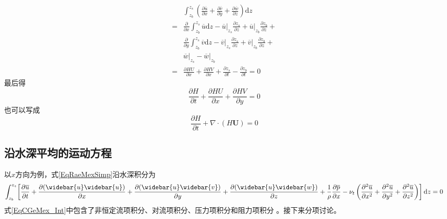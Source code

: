 \begin{equation*}
  \begin{aligned}
  &\int_{z_{b}}^{ z_{s}}\!
  \left(
  \frac{\partial \overline{u}}{\partial x} +
  \frac{\partial \overline{v}}{\partial y} +
  \frac{\partial \overline{w}}{\partial z} 
  \right)
  \mathrm{d}z
  \\
  =&
  \frac{\partial}{\partial x}
  \int_{z_{b}}^{ z_{s}}\!
  \overline{u}
  \mathrm{d}z
  -
  \left.\overline{u}\right|_{z_{s}}
    \frac{\partial z_{s}}{\partial z}
  +
  \left.\overline{u}\right|_{z_{b}}
    \frac{\partial z_{b}}{\partial z}
   + \\
  &
  \frac{\partial}{\partial y}
  \int_{z_{b}}^{ z_{s}}\!
  \overline{v}
  \mathrm{d}z
  -
  \left.\overline{v}\right|_{z_{s}}
    \frac{\partial z_{s}}{\partial z}
  +
  \left.\overline{v}\right|_{z_{b}}
    \frac{\partial z_{b}}{\partial z}
    + \\
  &
  \left.\overline{w}\right|_{z_{s}}
    -
    \left.\overline{w}\right|_{z_{b}}
      \\
  =&
  \frac{\partial HU}{\partial x} +
  \frac{\partial HV}{\partial x} +
  \frac{\partial  z_{s}}{\partial t} -
  \frac{\partial z_{b}}{\partial t}
  =
  0
  \end{aligned}
\end{equation*}
最后得
\begin{equation}
  \frac{\partial H}{\partial t} +
  \frac{\partial HU}{\partial x} +
  \frac{\partial HV}{\partial y}
  =
  0
\end{equation}
也可以写成
\begin{equation}
  \frac{\partial H}{\partial t} +
  \nabla\cdot(H\mathbf{U})
  =
  0
\end{equation}

\subsection{沿水深平均的运动方程}
以$x$方向为例，式\eqref{EqRaeMexSimp}沿水深积分为
\begin{equation}
    \int_{z_{b}}^{ z_{s}}\!
    \left[
  \frac{\partial \overline{u}}{\partial t} +
  \frac{\partial (\widebar{u}\widebar{u})}{\partial x} +
  \frac{\partial (\widebar{u}\widebar{v})}{\partial y} +
  \frac{\partial (\widebar{u}\widebar{w})}{\partial z} +
  \frac{1}{\rho}\frac{\partial \overline{p}}{\partial x} -
  \nu_{t}
  \left(
    \frac{\partial^{2} \overline{u}}{\partial x^{2}} +
    \frac{\partial^{2} \overline{u}}{\partial y^{2}} +
    \frac{\partial^{2} \overline{u}}{\partial z^{2}}
  \right)
  \right]
  \mathrm{d}z
  =
  0
  \label{EqCGeMex_Int}
\end{equation}
式\eqref{EqCGeMex_Int}中包含了非恒定流项积分、对流项积分、压力项积分和阻力项积分
。接下来分项讨论。

